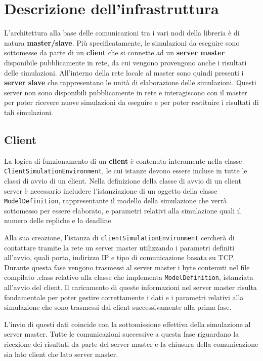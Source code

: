 
\section{Descrizione dell'infrastruttura}
L'architettura alla base delle comunicazioni tra i vari nodi della libreria è di natura \textbf{master/slave}.
Più specificatamente, le simulazioni da eseguire sono sottomesse da parte di un \textbf{client} che si connette ad un \textbf{server master} disponibile pubblicamente in rete, da cui vengono provengono anche i risultati delle simulazioni. 
All'interno della rete locale al master sono quindi presenti i \textbf{server slave} che rappresentano le unità di elaborazione delle simulazioni. Questi server non sono disponibili pubblicamente in rete e interagiscono con il master per poter ricevere nuove simulazioni da eseguire e per poter restituire i risultati di tali simulazioni.

\subsection{Client}
La logica di funzionamento di un \textbf{client} è contenuta interamente nella classe \texttt{ClientSimulationEnvironment}, le cui istanze devono essere incluse in tutte le classi di avvio di un client.
Nella definizione della classe di avvio di un client server è necessario includere l'istanziazione di un oggetto della classe \texttt{ModelDefinition}, rappresentante il modello della simulazione che verrà sottomesso per essere elaborato, e parametri relativi alla simulazione quali il numero delle repliche e la deadline.

Alla sua creazione, l'istanza di \texttt{clientSimulationEnvironment} cercherà di contattare tramite la rete un server master utilizzando i parametri definiti all'avvio, quali porta, indirizzo IP e tipo di comunicazione basata su TCP. 
Durante questa fase vengono trasmessi al server master i byte contenuti nel file compilato .class relativo alla classe che implementa \texttt{ModelDefinition}, istanziata all'avvio del client.
Il caricamento di queste informazioni nel server master risulta fondamentale per poter gestire correttamente i dati e i parametri relativi alla simulazione che sono trasmessi dal client successivamente alla prima fase.

L'invio di questi dati coincide con la sottomissione effettiva della simulazione al server master. 
Tutte le comunicazioni successive a questa fase riguardano la ricezione dei risultati da parte del server master e la chiusura della comunicazione sia lato client che lato server master.

